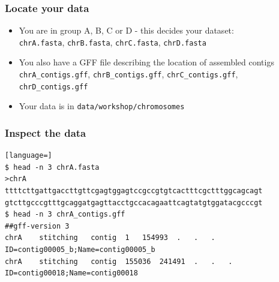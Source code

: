 \documentclass[table]{beamer}
\begin{document}
  \begin{frame}
    \frametitle{Locate your data}
    \begin{itemize}
      \item You are in group A, B, C or D - this decides your dataset: \\
      \texttt{chrA.fasta}, \texttt{chrB.fasta}, \texttt{chrC.fasta}, \texttt{chrD.fasta}
      \item You also have a GFF file describing the location of assembled contigs \\
      \texttt{chrA\_contigs.gff}, \texttt{chrB\_contigs.gff}, \texttt{chrC\_contigs.gff}, \texttt{chrD\_contigs.gff}
      \item Your data is in \texttt{data/workshop/chromosomes}
    \end{itemize}
  \end{frame}
  
\begin{frame}[fragile]
\frametitle{Inspect the data}
\begin{lstlisting}[language=]
$ head -n 3 chrA.fasta 
>chrA
ttttcttgattgaccttgttcgagtggagtccgccgtgtcactttcgctttggcagcagt
gtcttgcccgtttgcaggatgagttacctgccacagaattcagtatgtggatacgcccgt
$ head -n 3 chrA_contigs.gff 
##gff-version 3
chrA	stitching	contig	1	154993	.	.	.	ID=contig00005_b;Name=contig00005_b
chrA	stitching	contig	155036	241491	.	.	.	ID=contig00018;Name=contig00018
\end{lstlisting}
\end{frame}

%
\end{document}

